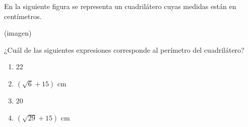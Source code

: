 \begin{problem}
    En la siguiente figura se representa un cuadrilátero cuyas medidas están en centímetros.

    \begin{center}
    (imagen)
    \end{center}

    ¿Cuál de las siguientes expresiones corresponde al perímetro del cuadrilátero?

    \begin{enumerate}[label=\Alph*.]
        \item 22\,
        \item $(\sqrt{6} + 15)$ cm
        \item 20\,
        \item $(\sqrt{29} + 15)$ cm
    \end{enumerate}
\end{problem}
